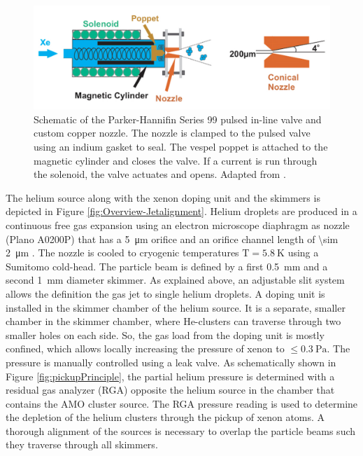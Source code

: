 \begin{figure}
	\centering
		\includegraphics[width=1.00\textwidth]{images/parker-valve.jpg}
	\caption[Schematic of the Parker-Hannifin Series 99 valve.]{Schematic of the Parker-Hannifin Series 99 pulsed in-line valve and custom copper nozzle. The nozzle is clamped to the pulsed valve using an indium gasket to seal. The vespel poppet is attached to the magnetic cylinder and closes the valve. If a current is run through the solenoid, the valve actuates and opens. Adapted from \citep[\href{http://creativecommons.org/licenses/by-nc/3.0/us}{\ccbync}]{Ferguson-2016-PhD}.}
	\label{fig:parker-valve}
\end{figure}
The helium source along with the xenon doping unit and the skimmers is depicted in Figure \ref{fig:Overview-Jetalignment}. Helium droplets are produced in a continuous free gas expansion using an electron microscope diaphragm as nozzle (Plano A0200P) that has a \SI{5}{\micro\meter} orifice and an orifice channel length of \SI{\sim 2}{\micro\meter} \citep{Gomez-2011-JCP}. The nozzle is cooled to cryogenic temperatures $\text{T}= \SI{5.8}{\kelvin}$ using a Sumitomo cold-head. The particle beam is defined by a first \SI{0.5}{\milli\meter} and a second \SI{1}{\milli\meter} diameter skimmer. As explained above, an adjustable slit system allows the definition the gas jet to single helium droplets. A doping unit is installed in the skimmer chamber of the helium source. It is a separate, smaller chamber in the skimmer chamber, where He-clusters can traverse through two smaller holes on each side. So, the gas load from the doping unit is mostly confined, which allows locally increasing the pressure of xenon to $\leq \SI{0.3}{\pascal}$. The pressure is manually controlled using a leak valve. As schematically shown in Figure \ref{fig:pickupPrinciple}, the partial helium pressure is determined with a residual gas analyzer (RGA) opposite the helium source in the chamber that contains the AMO cluster source. The RGA pressure reading is used to determine the depletion of the helium clusters through the pickup of xenon atoms. A thorough alignment of the sources is necessary to overlap the particle beams such they traverse through all skimmers.%
%
%
%
